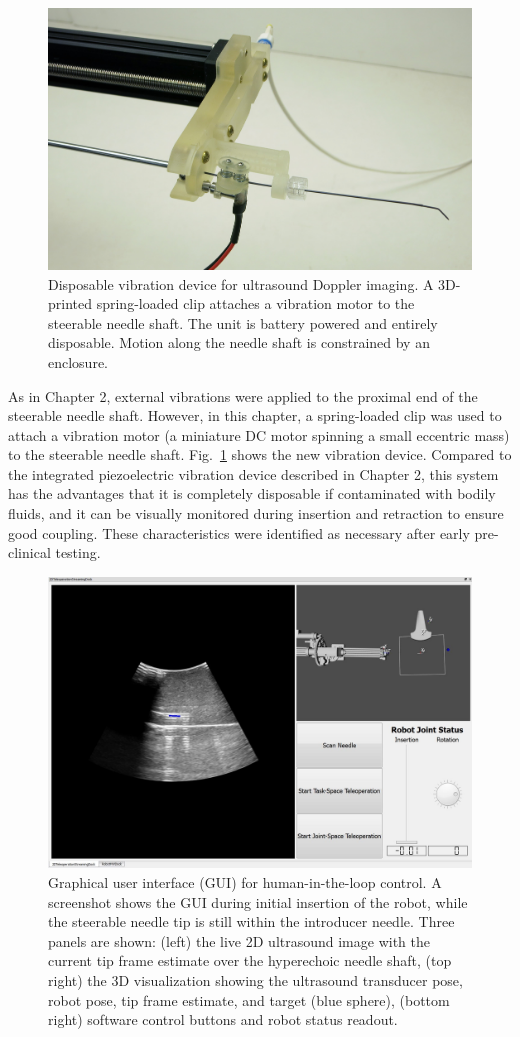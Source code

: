 \begin{figure}[!ht]
\centering
\includegraphics[width = 0.5\columnwidth]{./Images/Chapter5/Buzzer/Buzzer.jpg}%
\caption[Disposable vibration device]{Disposable vibration device for ultrasound Doppler imaging. A 3D-printed spring-loaded clip attaches a vibration motor to the steerable needle shaft. The unit is battery powered and entirely disposable. Motion along the needle shaft is constrained by an enclosure.}
\label{fig:Buzzer}
\end{figure}  

As in Chapter 2, external vibrations were applied to the proximal end of the steerable needle shaft. However, in this chapter, a spring-loaded clip was used to attach a vibration motor (a miniature DC motor spinning a small eccentric mass) to the steerable needle shaft. Fig.~\ref{fig:Buzzer} shows the new vibration device. Compared to the integrated piezoelectric vibration device described in Chapter 2, this system has the advantages that it is completely disposable if contaminated with bodily fluids, and it can be visually monitored during insertion and retraction to ensure good coupling. These characteristics were identified as necessary after early pre-clinical testing.

\begin{figure}[!t]
\centering
\includegraphics[width = \columnwidth]{./Images/Chapter5/GUI/GUI.jpg}%
\caption[Human-in-the-loop GUI]{Graphical user interface (GUI) for human-in-the-loop control. A screenshot shows the GUI during initial insertion of the robot, while the steerable needle tip is still within the introducer needle. Three panels are shown: (left) the live 2D ultrasound image with the current tip frame estimate over the hyperechoic needle shaft, (top right) the 3D visualization showing the ultrasound transducer pose, robot pose, tip frame estimate, and target (blue sphere), (bottom right) software control buttons and robot status readout.}
\label{fig:GUI}
\end{figure}  

